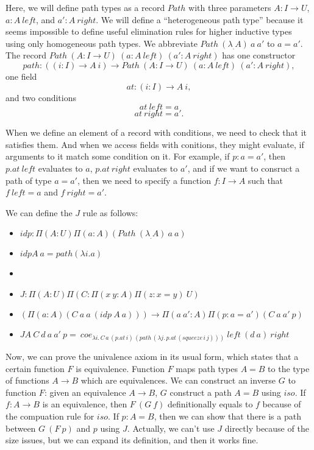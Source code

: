 \documentclass{amsart}
\theoremstyle{definition}
\theoremstyle{remark}
\numberwithin{figure}{section}
\begin{document}
Here, we will define path types as a record $Path$ with three parameters $A : I \to U$, $a : A\ left$, and $a' : A\ right$.
We will define a ``heterogeneous path type'' because it seems impossible to define useful elimination rules for higher inductive types using only homogeneous path types.
We abbreviate $Path\ (\lambda _. A)\ a\ a'$ to $a = a'$.
The record $Path\ (A : I \to U)\ (a : A\ left)\ (a' : A\ right)$ has one constructor
\[ path : ((i : I) \to A\ i) \to Path\ (A : I \to U)\ (a : A\ left)\ (a' : A\ right), \]
one field
\[ at : (i : I) \to A\ i, \]
and two conditions
\[ at\ left = a \]
\[ at\ right = a'. \]

When we define an element of a record with conditions, we need to check that it satisfies them.
And when we access fields with conitions, they might evaluate, if arguments to it match some condition on it.
For example, if $p : a = a'$, then $p.at\ left$ evaluates to $a$, $p.at\ right$ evaluates to $a'$,
and if we want to consruct a path of type $a = a'$, then we need to specify a function $f : I \to A$ such that $f\ left = a$ and $f\ right = a'$.

We can define the $J$ rule as follows:
\begin{itemize}
\item[] $idp : \Pi (A : U) \Pi (a : A) (Path\ (\lambda _. A)\ a\ a)$
\item[] $idp A\ a = path (\lambda i. a)$
\item[]
\item[] $J : \Pi (A : U) \Pi (C : \Pi (x\ y : A) \Pi (z : x = y)\ U)$
\item[] \qquad $(\Pi (a : A) (C\ a\ a\ (idp\ A\ a))) \to \Pi (a\ a' : A) \Pi (p : a = a') (C\ a\ a'\ p)$
\item[] $J A\ C\ d\ a\ a'\ p =\ coe_{\lambda i.\,C\,a\,(p.at\,i)\,(path\,(\lambda j.\,p.at\,(squeeze\,i\,j)))}\ left\ (d\ a)\ right$
\end{itemize}

Now, we can prove the univalence axiom in its usual form, which states that a certain function $F$ is equivalence.
Function $F$ maps path types $A = B$ to the type of functions $A \to B$ which are equivalences.
We can construct an inverse $G$ to function $F$: given an equivalence $A \to B$, $G$ construct a path $A = B$ using $iso$.
If $f : A \to B$ is an equivalence, then $F\ (G\ f)$ definitionally equals to $f$ because of the compuation rule for $iso$.
If $p : A = B$, then we can show that there is a path between $G\ (F\ p)$ and $p$ using $J$.
Actually, we can't use $J$ directly because of the size issues, but we can expand its definition, and then it works fine.
\end{document}
